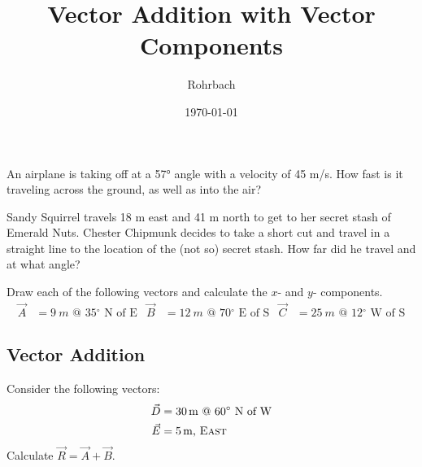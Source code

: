 \documentclass[10pt]{exam}
\title{Vector Addition with Vector Components}
\author{Rohrbach}
\date{\today}
\begin{document}
\maketitle


\begin{questions}

\question
  An airplane is taking off at a 57° angle with a velocity of 45 m/s.  How fast is it traveling across the ground, as well as into the air?
  \vs
  
\question
  Sandy Squirrel travels 18 m east and 41 m north to get to her secret stash of Emerald Nuts.  Chester Chipmunk decides to take a short cut and travel in a straight line to the location of the (not so) secret stash.  How far did he travel and at what angle?
  \vs

\question
  Draw each of the following vectors and calculate the $x$- and $y$- components.
  \begin{align*}
    \vec{A} &= \SI{9}{m}  \text{ @ 35$^\circ$ N of E} &
    \vec{B} &= \SI{12}{m}  \text{ @ 70$^\circ$ E of S} &
    \vec{C} &= \SI{25}{m} \text{ @ 12$^\circ$ W of S} 
  \end{align*}

  \vs[2]


\pagebreak

\begin{Sbox}\begin{minipage}{6.3in}

  \section*{Vector Addition}


\end{minipage}\end{Sbox}

\noindent
\uplevel{\shadowbox{\TheSbox}}


\question

  Consider the following vectors:
  \begin{align*}
    \vec{D} &= \SI{30}{m} \text{ @ 60$^\circ$ N of W} \\
    \vec{E} &= \SI{5}{m} \text{, \sc East}
  \end{align*}
  Calculate $\vec{R}=\vec{A}+\vec{B}$.

  \vs[3]
  
\end{questions}
\end{document}
